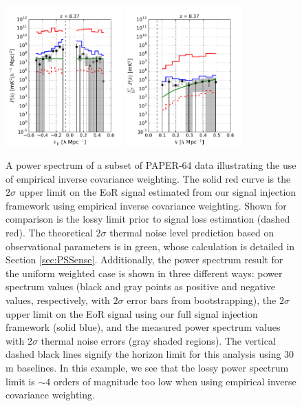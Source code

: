 \documentclass[preprint2,numberedappendix,tighten]{aastex6}  %
\begin{document}
\begin{figure}
	\centering
	\includegraphics[width=0.4\textwidth]{plots/ps1_data.pdf}
	\includegraphics[width=0.4\textwidth]{plots/ps2_data.pdf}
	\caption{A power spectrum of a subset of PAPER-64 data illustrating the use of empirical inverse covariance weighting. The solid red curve is the $2\sigma$ upper limit on the EoR signal estimated from our signal injection framework using empirical inverse covariance weighting. Shown for comparison is the lossy limit prior to signal loss estimation (dashed red). The theoretical $2\sigma$ thermal noise level prediction based on observational parameters is in green, whose calculation is detailed in Section \ref{sec:PSSense}. Additionally, the power spectrum result for the uniform weighted case is shown in three different ways: power spectrum values (black and gray points as positive and negative values, respectively, with $2\sigma$ error bars from bootstrapping), the $2\sigma$ upper limit on the EoR signal using our full signal injection framework (solid blue), and the measured power spectrum values with $2\sigma$ thermal noise errors (gray shaded regions). The vertical dashed black lines signify the horizon limit for this analysis using $30$\,m baselines. In this example, we see that the lossy power spectrum limit is $\sim 4$ orders of magnitude too low when using empirical inverse covariance weighting.}
\label{fig:ps2_data}
\end{figure}
\end{document}
